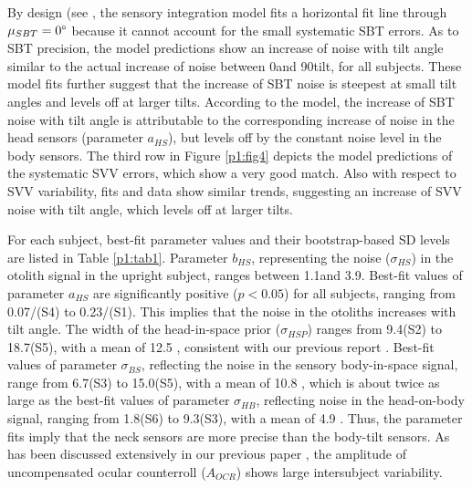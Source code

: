 By design (see , the sensory integration model fits a horizontal fit line through $\mu_{SBT} = 0\degree$ because it cannot account for the small systematic SBT errors. As to SBT precision, the model predictions show an increase of noise with tilt angle similar to the actual increase of noise between 0\mydegree and 90\mydegree tilt, for all subjects. These model fits further suggest that the increase of SBT noise is steepest at small tilt angles and levels off at larger tilts. According to the model, the increase of SBT noise with tilt angle is attributable to the corresponding increase of noise in the head sensors (parameter $a_{HS}$), but levels off by the constant noise level in the body sensors. The third row in Figure \ref{p1:fig4} depicts the model predictions of the systematic SVV errors, which show a very good match. Also with respect to SVV variability, fits and data show similar trends, suggesting an increase of SVV noise with tilt angle, which levels off at larger tilts. 

For each subject, best-fit parameter values and their bootstrap-based SD levels are listed in Table \ref{p1:tab1}. Parameter $b_{HS}$, representing the noise ($\sigma_{HS}$) in the otolith signal in the upright subject, ranges between 1.1\mydegree and 3.9\textdegree. Best-fit values of parameter $a_{HS}$ are significantly positive ($p < 0.05$) for all subjects, ranging from 0.07\textdegree/\mydegree (S4) to 0.23\textdegree/\mydegree (S1). This implies that the noise in the otoliths increases with tilt angle. The width of the head-in-space prior ($\sigma_{HSP}$) ranges from 9.4\mydegree (S2) to 18.7\mydegree (S5), with a mean of 12.5 \textdegree, consistent with our previous report \cite{devrijer2009}. Best-fit values of parameter $\sigma_{BS}$, reflecting the noise in the sensory body-in-space signal, range from 6.7\mydegree (S3) to 15.0\mydegree (S5), with a mean of 10.8 \textdegree, which is about twice as large as the best-fit values of parameter $\sigma_{HB}$, reflecting noise in the head-on-body signal, ranging from 1.8\mydegree (S6) to 9.3\mydegree (S3), with a mean of 4.9 \textdegree. Thus, the parameter fits imply that the neck sensors are more precise than the body-tilt sensors. As has been discussed extensively in our previous paper \cite{devrijer2009}, the amplitude of uncompensated ocular counterroll ($A_{OCR}$) shows large intersubject variability. 

